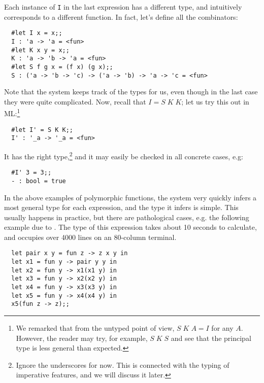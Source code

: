 Each instance of {\tt I} in the last expression has a different type, and
intuitively corresponds to a different function. In fact, let's define all the
combinators:

\begin{boxed}\begin{verbatim}
  #let I x = x;;
  I : 'a -> 'a = <fun>
  #let K x y = x;;
  K : 'a -> 'b -> 'a = <fun>
  #let S f g x = (f x) (g x);;
  S : ('a -> 'b -> 'c) -> ('a -> 'b) -> 'a -> 'c = <fun>
\end{verbatim}\end{boxed}

Note that the system keeps track of the types for us, even though in the last
case they were quite complicated. Now, recall that $I = S\; K\; K$; let us try
this out in ML:\footnote{We remarked that from the untyped point of view, $S\;
K\; A = I$ for any $A$. However, the reader may try, for example, $S\; K\; S$
and see that the principal type is less general than expected.}

\begin{boxed}\begin{verbatim}
  #let I' = S K K;;
  I' : '_a -> '_a = <fun>
\end{verbatim}\end{boxed}

\noindent It has the right type,\footnote{Ignore the underscores for now. This
is connected with the typing of imperative features, and we will discuss it
later.} and it may easily be checked in all concrete cases, e.g:

\begin{boxed}\begin{verbatim}
  #I' 3 = 3;;
  - : bool = true
\end{verbatim}\end{boxed}

In the above examples of polymorphic functions, the system very quickly infers
a most general type for each expression, and the type it infers is simple. This
usually happens in practice, but there are pathological cases, e.g. the
following example due to . The type of this expression takes
about 10 seconds to calculate, and occupies over 4000 lines on an 80-column
terminal.

\begin{boxed}\begin{verbatim}
  let pair x y = fun z -> z x y in
  let x1 = fun y -> pair y y in
  let x2 = fun y -> x1(x1 y) in
  let x3 = fun y -> x2(x2 y) in
  let x4 = fun y -> x3(x3 y) in
  let x5 = fun y -> x4(x4 y) in
  x5(fun z -> z);;
\end{verbatim}\end{boxed}


